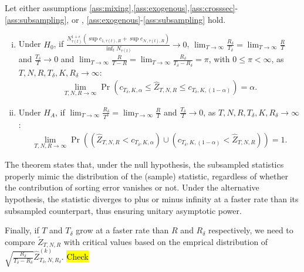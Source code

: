 \begin{theorem}
\label{th:subsampling}

Let either assumptions \ref{ass:mixing},\ref{ass:exogenous},\ref{ass:crosssec}-\ref{ass:subsampling}, or , \ref{ass:exogenous}-\ref{ass:subsampling} hold. 

\begin{enumerate}[(i)]
\item Under $H_{0}$, if $\frac{N_{\tau(t)}^{1+\epsilon} \left( \sup c_{1, \tau(t),R} + \sup c_{\mathcal{N}, \tau(t),R} \right)}{\inf_{t}N_{\tau(t)}} \rightarrow 0$, $\lim_{T \rightarrow \infty }\frac{R_\delta}{T_\delta}=\lim_{T \rightarrow \infty }\frac{R}{T}$ and $\frac{T_\delta}{T}\rightarrow 0$ and $\lim_{T \rightarrow \infty }\frac{R}{T-R}=\lim_{T \rightarrow \infty }\frac{R_\delta}{T_\delta-R_\delta}=\pi$, with $0 \leq \pi <\infty$, as $T,N,R,T_\delta,K,R_\delta\rightarrow \infty$:
\begin{align*}
    \lim_{T,N,R\rightarrow \infty }\Pr \left( c_{T_\delta,K,\alpha }\leq \widehat{Z}_{T,N,R}\leq c_{T_\delta,K,(1-\alpha )}\right) = \alpha.
\end{align*}

\item Under $H_{A}$, if $\lim_{T \rightarrow \infty }\frac{R_\delta}{T^\delta}=\lim_{T \rightarrow \infty }\frac{R}{T}$ and $\frac{T_\delta}{T} \rightarrow 0$, as $T,N,R,T_\delta,K,R_\delta \rightarrow \infty$:
\begin{align*}
    \lim_{T,N,R\rightarrow \infty }\Pr \left( \left( \widehat{Z}_{T,N,R}<c_{T_\delta,K,\alpha }\right) \cup \left( c_{T_\delta,K,(1-\alpha )} < \widehat{Z}_{T,N,R}\right) \right) = 1.
\end{align*}
\end{enumerate}

\end{theorem}

\noindent
The theorem states that, under the null hypothesis, the subsampled statistics properly mimic the distribution of the (sample) statistic, regardless of whether the contribution of sorting error vanishes or not. Under the alternative hypothesis, the statistic diverges to plus or minus infinity at a faster rate than its subsampled counterpart, thus ensuring unitary asymptotic power. 

Finally, if $T$ and $T_\delta$ grow at a faster rate than $R$ and $R_\delta$ respectively, we need to compare $\widetilde{Z}_{T,N,R}$ with critical values based on the emprical distribution of $\sqrt{\frac{R_\delta}{T_\delta-R_\delta}} \widehat{Z}_{T_\delta,N,R_\delta}^{(k)}$. \hl{Check}


